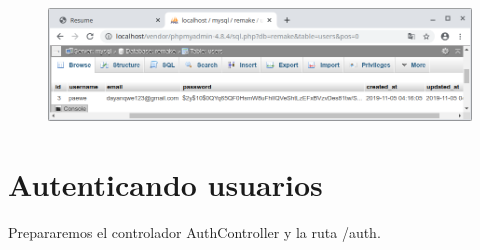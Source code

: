 \documentclass{article}
\begin{document}
\newpage

\begin{figure}[h!]
  \centering
  \includegraphics[scale=0.5]{./Pictures/197_user_bd_ok.png}
\end{figure}

\newpage

\section{Autenticando usuarios}%
Prepararemos el controlador AuthController y la ruta /auth.\\
\end{document}
